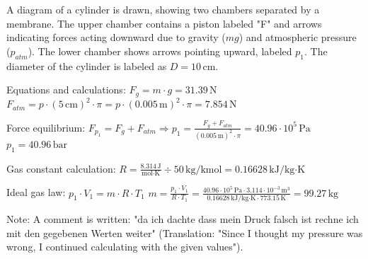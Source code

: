 A diagram of a cylinder is drawn, showing two chambers separated by a membrane. The upper chamber contains a piston labeled "F" and arrows indicating forces acting downward due to gravity (\( mg \)) and atmospheric pressure (\( p_{atm} \)). The lower chamber shows arrows pointing upward, labeled \( p_1 \). The diameter of the cylinder is labeled as \( D = 10 \, \text{cm} \).  

Equations and calculations:  
\( F_g = m \cdot g = 31.39 \, \text{N} \)  
\( F_{atm} = p \cdot (5 \, \text{cm})^2 \cdot \pi = p \cdot (0.005 \, \text{m})^2 \cdot \pi = 7.854 \, \text{N} \)  

Force equilibrium:  
\( F_{p_1} = F_g + F_{atm} \Rightarrow p_1 = \frac{F_g + F_{atm}}{(0.005 \, \text{m})^2 \cdot \pi} = 40.96 \cdot 10^5 \, \text{Pa} \)  
\( p_1 = 40.96 \, \text{bar} \)  

Gas constant calculation:  
\( R = \frac{8.314 \, \text{J}}{\text{mol} \cdot \text{K}} \div 50 \, \text{kg/kmol} = 0.16628 \, \text{kJ/kg·K} \)  

Ideal gas law:  
\( p_1 \cdot V_1 = m \cdot R \cdot T_1 \)  
\( m = \frac{p_1 \cdot V_1}{R \cdot T_1} = \frac{40.96 \cdot 10^5 \, \text{Pa} \cdot 3.114 \cdot 10^{-3} \, \text{m}^3}{0.16628 \, \text{kJ/kg·K} \cdot 773.15 \, \text{K}} = 99.27 \, \text{kg} \)  

Note: A comment is written: "da ich dachte dass mein Druck falsch ist rechne ich mit den gegebenen Werten weiter" (Translation: "Since I thought my pressure was wrong, I continued calculating with the given values").